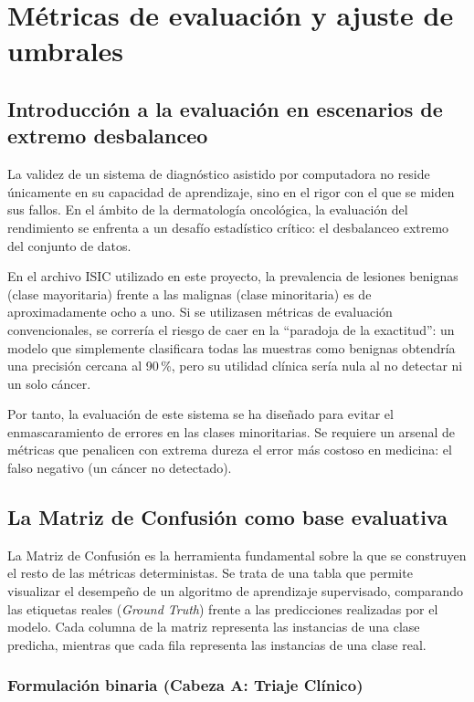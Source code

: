 \chapter{Métricas de evaluación y ajuste de umbrales}

\section{Introducción a la evaluación en escenarios de extremo desbalanceo}

La validez de un sistema de diagnóstico asistido por computadora no reside únicamente en su capacidad de aprendizaje, sino en el rigor con el que se miden sus fallos. En el ámbito de la dermatología oncológica, la evaluación del rendimiento se enfrenta a un desafío estadístico crítico: el desbalanceo extremo del conjunto de datos.

En el archivo ISIC utilizado en este proyecto, la prevalencia de lesiones benignas (clase mayoritaria) frente a las malignas (clase minoritaria) es de aproximadamente ocho a uno. Si se utilizasen métricas de evaluación convencionales, se correría el riesgo de caer en la ``paradoja de la exactitud'': un modelo que simplemente clasificara todas las muestras como benignas obtendría una precisión cercana al 90\,\%, pero su utilidad clínica sería nula al no detectar ni un solo cáncer.

Por tanto, la evaluación de este sistema se ha diseñado para evitar el enmascaramiento de errores en las clases minoritarias. Se requiere un arsenal de métricas que penalicen con extrema dureza el error más costoso en medicina: el falso negativo (un cáncer no detectado).

\section{La Matriz de Confusión como base evaluativa}

La Matriz de Confusión es la herramienta fundamental sobre la que se construyen el resto de las métricas deterministas. Se trata de una tabla que permite visualizar el desempeño de un algoritmo de aprendizaje supervisado, comparando las etiquetas reales (\textit{Ground Truth}) frente a las predicciones realizadas por el modelo. Cada columna de la matriz representa las instancias de una clase predicha, mientras que cada fila representa las instancias de una clase real.

\subsection{Formulación binaria (Cabeza A: Triaje Clínico)}

